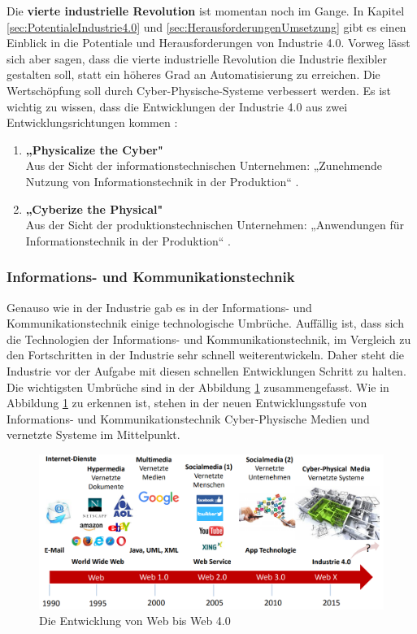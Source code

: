 \newline\newline
Die \textbf{vierte industrielle Revolution} ist momentan noch im Gange. In Kapitel \ref{sec:PotentialeIndustrie4.0} und \ref{sec:HerausforderungenUmsetzung} gibt es einen Einblick in die Potentiale und Herausforderungen von Industrie 4.0. Vorweg lässt sich aber sagen, dass die vierte industrielle Revolution die Industrie flexibler gestalten soll, statt ein höheres Grad an Automatisierung zu erreichen. Die Wertschöpfung soll durch Cyber-Physische-Systeme verbessert werden. Es ist wichtig zu wissen, dass die Entwicklungen der Industrie 4.0 aus zwei Entwicklungsrichtungen kommen \cite{1}:
\begin{enumerate}
	\item \textbf{„Physicalize the Cyber"} \cite{1} \\ Aus der Sicht der informationstechnischen Unternehmen: „Zunehmende Nutzung von Informationstechnik in der Produktion“ \cite{1}.
	\item \textbf{„Cyberize the Physical"} \cite{1} \\ Aus der Sicht der produktionstechnischen Unternehmen: „Anwendungen für Informationstechnik in der Produktion“ \cite{1}.
\end{enumerate}

\subsubsection{Informations- und Kommunikationstechnik}\label{sec:WebRevolution}
Genauso wie in der Industrie gab es in der Informations- und Kommunikationstechnik einige technologische Umbrüche. Auffällig ist, dass sich die Technologien der Informations- und Kommunikationstechnik, im Vergleich zu den Fortschritten in der Industrie sehr schnell weiterentwickeln. Daher steht die Industrie vor der Aufgabe mit diesen schnellen Entwicklungen Schritt zu halten. Die wichtigsten Umbrüche sind in der Abbildung \ref{fig:WebRevolutionBild} zusammengefasst. Wie in Abbildung \ref{fig:WebRevolutionBild} zu erkennen ist, stehen in der neuen Entwicklungsstufe von Informations- und Kommunikationstechnik Cyber-Physische Medien und vernetzte Systeme im Mittelpunkt.
\begin{figure}[h]
	\centering
	\includegraphics[width=1\linewidth]{Bilder/A2_EntwicklungWeb0-4}
	\caption{Die Entwicklung von Web bis Web 4.0 \cite{A2}}
	\label{fig:WebRevolutionBild}
\end{figure}

